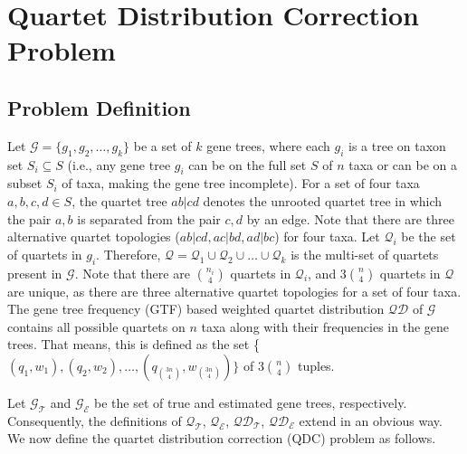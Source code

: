 \documentclass[10pt,a4paper]{article}
\begin{document}

\section{Quartet Distribution Correction Problem}
\subsection{Problem Definition}
Let $\mathcal{G} =  \{g_1, g_2, \ldots, g_k\}$ be a set of $k$ gene trees, where each $g_i$ is a tree on taxon set $S_i \subseteq S$ (i.e., any gene tree $g_i$ can be on the full set $S$ of $n$ taxa or can be on a subset $S_i$ of taxa, making the gene tree incomplete). For a set of four taxa $a,b,c,d \in S$, the quartet tree $ab|cd$ denotes the unrooted quartet tree in which the pair $a, b$ is separated from the pair $c, d$ by an edge. Note that there are three alternative quartet topologies ($ab|cd, ac|bd, ad|bc$) for four taxa.
Let $\mathcal{Q}_i$ be the set of quartets in $g_i$. Therefore, $\mathcal{Q} = \mathcal{Q}_1 \cup \mathcal{Q}_2 \cup \ldots \cup \mathcal{Q}_k$ is the multi-set of quartets present in $\mathcal{G}$. Note that there are $n_i \choose 4$ quartets in $\mathcal{Q}_i$, and $3$$n \choose 4$ quartets in $\mathcal{Q}$ are unique, as there are three alternative quartet topologies for a set of four taxa. %
The gene tree frequency (GTF) based weighted quartet distribution $\mathcal{QD}$ of $\mathcal{G}$ contains all possible quartets on $n$ taxa along with their frequencies in the gene trees. That means, this is defined as the set \{$(q_1,w_1), (q_2,w_2), \ldots, (q_{3n \choose 4},w_{3n \choose 4})\}$ of $3$$n \choose 4$ tuples. %

Let $\mathcal{G_T}$ and $\mathcal{G_E}$ be the set of true and estimated gene trees, respectively. Consequently, the definitions of $\mathcal{Q_T}$, $\mathcal{Q_E}$, $\mathcal{QD_T}$, $\mathcal{QD_E}$ extend in an obvious way. %
We now define the quartet distribution correction (QDC) problem as follows.
\end{document}
